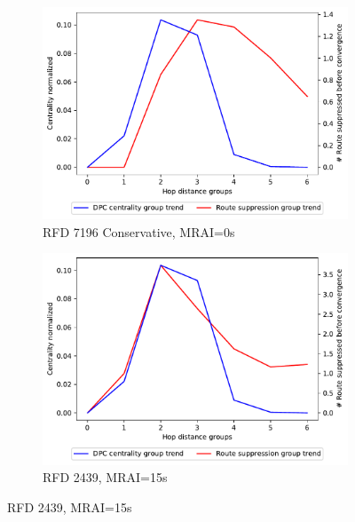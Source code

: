 \begin{figure}[H]
\begin{subfigure}[b]{0.325\textwidth}
     \end{subfigure}
     \hfill
     \begin{subfigure}[b]{0.325\textwidth}
         \centering
         \includegraphics[width=\textwidth]{images/RFD/miceVSelephants/MultiMRAI/0/mice/cisco_1000_RFD_7196_conservative_nodeConvergence_centVSsup_trend.pdf}
         \caption{\scriptsize RFD 7196 Conservative, MRAI=0s}
         \label{fig:1000_7196RFDC_centVSsup_mices_MRAI0}
     \end{subfigure}
     \vfill
     \begin{subfigure}[b]{0.325\textwidth}
         \centering
         \includegraphics[width=\textwidth]{images/RFD/miceVSelephants/MultiMRAI/15/mice/cisco_1000_RFD_nodeConvergence_centVSsup_trend.pdf}
         \caption{\scriptsize RFD 2439, MRAI=15s}
         \label{fig:1000_2439RFD_centVSsup_mices_MRAI15}

\end{subfigure}
\end{figure}
